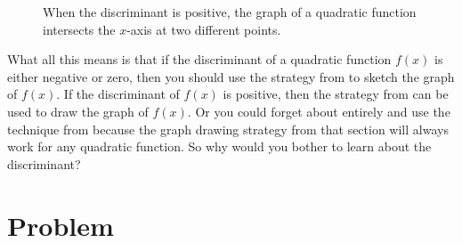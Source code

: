 \documentclass[a4paper,oneside,12pt]{article}
\begin{document}
\begin{figure}[!htbp]
\centering
{}
\qquad
\caption{%
  When the discriminant is positive, the graph of a quadratic function
  intersects the $x$-axis at two different points.
}
\label{fig:positive_discriminant}
\end{figure}

What all this means is that if the discriminant of a quadratic
function $f(x)$ is either negative or zero, then you should use the
strategy from  to sketch the graph of
$f(x)$.  If the discriminant of $f(x)$ is positive, then the strategy
from  can be used to draw the graph of
$f(x)$.  Or you could forget about 
entirely and use the technique from  because
the graph drawing strategy from that section will always work for any
quadratic function.  So why would you bother to learn about the
discriminant?



\section*{Problem}
\end{document}
